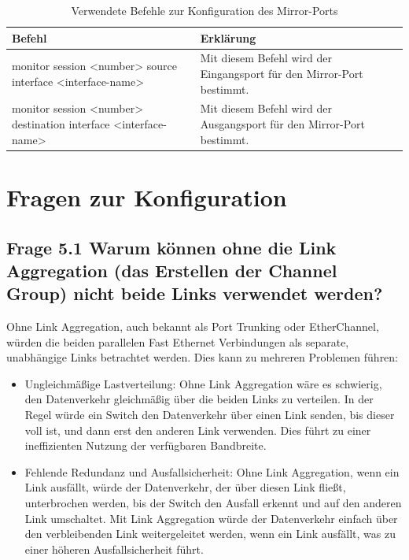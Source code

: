 \documentclass{article}
\begin{document}
\begin{table}[htbp]
    \centering
    \begin{tabularx}{\textwidth}{|X|X|}
        \toprule
        \textbf{Befehl} & \textbf{Erklärung} \\
        \midrule
        monitor session <number> source interface <interface-name> & Mit diesem Befehl wird der Eingangsport für den Mirror-Port bestimmt.\\
        \hline
        monitor session <number> destination interface <interface-name> & Mit diesem Befehl wird der Ausgangsport für den Mirror-Port bestimmt.\\
        \bottomrule
    \end{tabularx}
    \caption{Verwendete Befehle zur Konfiguration des Mirror-Ports}
    \label{tab:commands}
\end{table}


\section{Fragen zur Konfiguration}

\subsection*{Frage 5.1 \normalfont Warum können ohne die Link Aggregation (das Erstellen der Channel Group) nicht beide Links verwendet werden?}
Ohne Link Aggregation, auch bekannt als Port Trunking oder EtherChannel, würden die beiden parallelen Fast Ethernet Verbindungen als separate, unabhängige Links betrachtet werden. Dies kann zu mehreren Problemen führen:
\begin{itemize}
  \item Ungleichmäßige Lastverteilung: Ohne Link Aggregation wäre es schwierig, den Datenverkehr gleichmäßig über die beiden Links zu verteilen. In der Regel würde ein Switch den Datenverkehr über einen Link senden, bis dieser voll ist, und dann erst den anderen Link verwenden. Dies führt zu einer ineffizienten Nutzung der verfügbaren Bandbreite.\\

  \item Fehlende Redundanz und Ausfallsicherheit: Ohne Link Aggregation, wenn ein Link ausfällt, würde der Datenverkehr, der über diesen Link fließt, unterbrochen werden, bis der Switch den Ausfall erkennt und auf den anderen Link umschaltet. Mit Link Aggregation würde der Datenverkehr einfach über den verbleibenden Link weitergeleitet werden, wenn ein Link ausfällt, was zu einer höheren Ausfallsicherheit führt.\\
\end{itemize}
\end{document}
